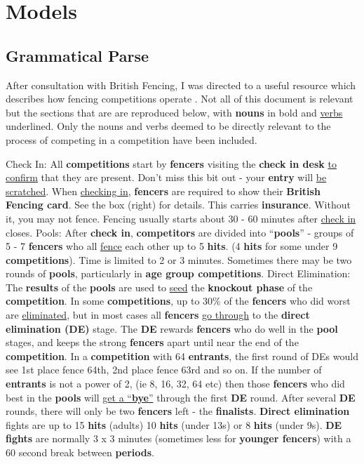 \chapter{Models}
\section{Grammatical Parse} \label{section:gramaticalParse}
After consultation with British Fencing, I was directed to a useful resource
which describes how fencing competitions operate \citep{bfcompguide}. Not
all of this document is relevant but the sections that are are reproduced
below, with \textbf{nouns} in bold and \underline{verbs} underlined. Only the
nouns and verbs deemed to be directly relevant to the process of competing in a
competition have been included.
\begin{displayquote}
Check In: All \textbf{competitions} start by \textbf{fencers}
visiting the \textbf{check in desk} \underline{to confirm} that they
are present. Don’t miss this bit out - your \textbf{entry}
will \underline{be scratched}.
When \underline{checking in}, \textbf{fencers} are required to show
their \textbf{British Fencing card}. See the box (right) for
details. This carries \textbf{insurance}. Without it, you
may not fence. Fencing usually starts about 30 - 60 minutes
after \underline{check in} closes.
Pools: After \textbf{check in}, \textbf{competitors} are divided
into “\textbf{pools}” - groups of 5 - 7 \textbf{fencers} who all
\underline{fence} each other up to 5 \textbf{hits}. (4 \textbf{hits} for some
under 9 \textbf{competitions}). Time is limited to 2 or 3
minutes. Sometimes there may be two rounds of
\textbf{pools}, particularly in \textbf{age group competitions}.
Direct Elimination: The \textbf{results} of the \textbf{pools}
are used to \underline{seed} the \textbf{knockout phase} of the
\textbf{competition}. In some \textbf{competitions}, up to 30\%
of the \textbf{fencers} who did worst are \underline{eliminated}, but
in most cases all \textbf{fencers} \underline{go through} to the \textbf{direct
elimination (DE)} stage.
The \textbf{DE} rewards \textbf{fencers} who do well in the
\textbf{pool} stages, and keeps the strong \textbf{fencers} apart
until near the end of the \textbf{competition}. In a
\textbf{competition} with 64 \textbf{entrants}, the first round of
DEs would see 1st place fence 64th, 2nd place
fence 63rd and so on. If the number of
\textbf{entrants} is not a power of 2, (ie 8, 16, 32, 64
etc) then those \textbf{fencers} who did best in the \textbf{pools}
will \underline{get a “\textbf{bye}”} through the first \textbf{DE} round. After
several \textbf{DE} rounds, there will only be two \textbf{fencers}
left - the \textbf{finalists}.
\textbf{Direct elimination} fights are up to 15 \textbf{hits} (adults)
10 \textbf{hits} (under 13s) or 8 \textbf{hits} (under 9s). \textbf{DE fights}
are normally 3 x 3 minutes (sometimes less for \textbf{younger
fencers}) with a 60 second break between \textbf{periods}.
\end{displayquote}
